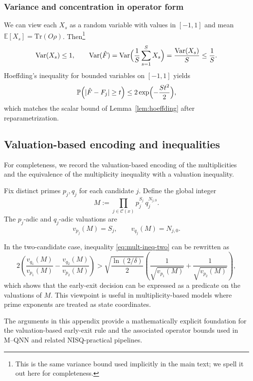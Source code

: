 \documentclass[11pt]{article}
\begin{document}
\subsubsection{Variance and concentration in operator form}

We can view each \(X_s\) as a random variable with values in \([-1,1]\)
and mean \(\mathbb{E}[X_s] = \mathrm{Tr}(O\rho)\).
Then\footnote{This is the same variance bound used implicitly in the
main text; we spell it out here for completeness.}
\begin{equation}
  \mathrm{Var}(X_s)
  \le 1,
  \qquad
  \mathrm{Var}(\hat{F})
  =
  \mathrm{Var}\Bigl(\frac{1}{S}\sum_{s=1}^S X_s\Bigr)
  =
  \frac{\mathrm{Var}(X_s)}{S}
  \le \frac{1}{S}.
\end{equation}
Hoeffding's inequality for bounded variables on \([-1,1]\) yields
\begin{equation}
  \mathbb{P}\Bigl(
    |\hat{F} - F_j|
    \ge t
  \Bigr)
  \le 2\exp\Bigl(-\frac{S t^2}{2}\Bigr),
\end{equation}
which matches the scalar bound of Lemma~\ref{lem:hoeffding} after
reparametrization.

\subsection{Valuation-based encoding and inequalities}
\label{app:valuation}

For completeness, we record the valuation-based encoding of the
multiplicities and the equivalence of the multiplicity inequality with
a valuation inequality.

Fix distinct primes \(p_j, q_j\) for each candidate \(j\).
Define the global integer
\begin{equation}
  M
  :=
  \prod_{j\in\mathcal{C}(x)}
  p_j^{S_j} \, q_j^{N_{j,0}}.
\end{equation}
The \(p_j\)-adic and \(q_j\)-adic valuations are
\begin{equation}
  v_{p_j}(M) = S_j,
  \qquad
  v_{q_j}(M) = N_{j,0}.
\end{equation}

In the two-candidate case, inequality
\eqref{eq:mult-ineq-two} can be rewritten as
\begin{equation}
  2\left(
    \frac{v_{q_1}(M)}{v_{p_1}(M)}
    -
    \frac{v_{q_2}(M)}{v_{p_2}(M)}
  \right)
  >
  \sqrt{\frac{\ln(2/\delta)}{2}}
  \left(
    \frac{1}{\sqrt{v_{p_1}(M)}}
    +
    \frac{1}{\sqrt{v_{p_2}(M)}}
  \right),
\end{equation}
which shows that the early-exit decision can be expressed as a
predicate on the valuations of \(M\).
This viewpoint is useful in multiplicity-based models where prime
exponents are treated as state coordinates.

\medskip

The arguments in this appendix provide a mathematically explicit
foundation for the valuation-based early-exit rule and the associated
operator bounds used in M--QNN and related NISQ-practical pipelines.

\nocite{*}


\end{document}
